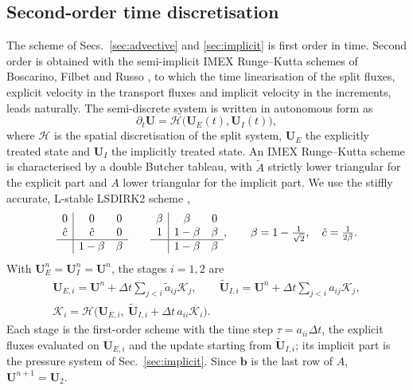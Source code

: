 \documentclass[a4paper,fleqn]{cas-sc}
\begin{document}
\subsection{Second-order time discretisation}
\label{sec:time}
The scheme of Secs.~\ref{sec:advective} and \ref{sec:implicit} is first order in time. Second order is obtained with the
semi-implicit IMEX Runge--Kutta schemes of Boscarino, Filbet and Russo \cite{BoscarinoFilbetRusso2016}, to which the time
linearisation of the split fluxes, explicit velocity in the transport fluxes and implicit velocity in the increments, leads
naturally. The semi-discrete system is written in autonomous form as
\begin{equation}
\partial_t\mathbf U=\mathcal H\big(\mathbf U_E(t),\mathbf U_I(t)\big),
\label{eq:autonomous}
\end{equation}
where $\mathcal H$ is the spatial discretisation of the split system, $\mathbf U_E$ the explicitly treated state and $\mathbf U_I$ the
implicitly treated state. An IMEX Runge--Kutta scheme \cite{Ascher1997,PareschiRusso2005} is characterised by a double Butcher
tableau, with $\tilde A$ strictly lower triangular for the explicit part and $A$ lower triangular for the implicit part. We use the
stiffly accurate, L-stable LSDIRK2 scheme \cite{BoscarinoFilbetRusso2016,Avgerinos2019},
\begin{equation}
\begin{array}{c|cc}0&0&0\\ \hat c&\hat c&0\\\hline &1-\beta&\beta\end{array}\qquad
\begin{array}{c|cc}\beta&\beta&0\\ 1&1-\beta&\beta\\\hline &1-\beta&\beta\end{array},\qquad \beta=1-\tfrac1{\sqrt2},\quad \hat c=\tfrac1{2\beta}.
\label{eq:lsdirk}
\end{equation}
With $\mathbf U^n_E=\mathbf U^n_I=\mathbf U^n$, the stages $i=1,2$ are
\begin{equation}
\begin{gathered}
\mathbf U_{E,i}=\mathbf U^n+\Delta t\sum_{j<i}\tilde a_{ij}\mathcal K_j,\qquad \tilde{\mathbf U}_{I,i}=\mathbf U^n+\Delta t\sum_{j<i}a_{ij}\mathcal K_j,\\
\mathcal K_i=\mathcal H\big(\mathbf U_{E,i},\ \tilde{\mathbf U}_{I,i}+\Delta t\,a_{ii}\mathcal K_i\big).
\end{gathered}
\label{eq:stages}
\end{equation}
Each stage is the first-order scheme with the time step $\tau=a_{ii}\Delta t$, the explicit fluxes evaluated on $\mathbf U_{E,i}$ and
the update starting from $\tilde{\mathbf U}_{I,i}$; its implicit part is the pressure system of Sec.~\ref{sec:implicit}. Since $\mathbf b$
is the last row of $A$, $\mathbf U^{n+1}=\mathbf U_2$.
\end{document}
